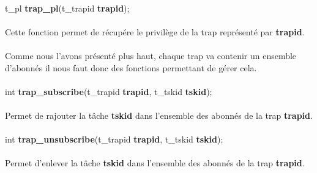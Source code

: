 \documentclass[10pt,a4wide]{article}
\begin{document}
\paragraph{}

\hspace{1.5cm}t\_pl \textbf{trap\_pl}(t\_trapid \textbf{trapid});

\paragraph{}

Cette fonction permet de r\'ecup\'ere le privil\`ege de la trap repr\'esent\'e par \textbf{trapid}.

\paragraph{}

Comme nous l'avons pr\'esent\'e plus haut, chaque trap va contenir un ensemble d'abonn\'es il nous faut donc des fonctions
permettant de g\'erer cela.

\paragraph{}

\hspace{1.5cm}int \textbf{trap\_subscribe}(t\_trapid \textbf{trapid},
                                           t\_tskid \textbf{tskid});

\paragraph{}

Permet de rajouter la t\^ache \textbf{tskid} dans l'ensemble des abonn\'es de la trap \textbf{trapid}.

\paragraph{}

\hspace{1.5cm}int \textbf{trap\_unsubscribe}(t\_trapid \textbf{trapid},
                                             t\_tskid \textbf{tskid});

\paragraph{}

Permet d'enlever la t\^ache \textbf{tskid} dans l'ensemble des abonn\'es de la trap \textbf{trapid}.
\end{document}
